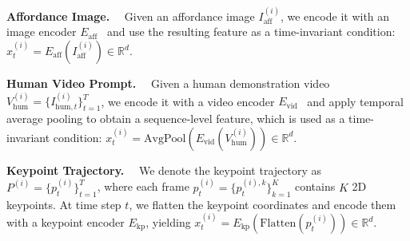 


\textbf{Affordance Image.}~~
Given an affordance image $I_{\mathrm{aff}}^{(i)}$, we encode it with an image encoder $E_{\mathrm{aff}}$~\cite{he2016deep} and use the resulting feature as a time-invariant condition: $x_t^{(i)}=E_{\mathrm{aff}}(I_{\mathrm{aff}}^{(i)})\in\mathbb{R}^{d}$.

\textbf{Human Video Prompt.}~~
Given a human demonstration video $V_{\mathrm{hum}}^{(i)}=\{I_{\mathrm{hum},t}^{(i)}\}_{t=1}^{T}$, we encode it with a video encoder $E_{\mathrm{vid}}$~\cite{bertasius2021space} and apply temporal average pooling to obtain a sequence-level feature, which is used as a time-invariant condition: $x_t^{(i)}=\mathrm{AvgPool}(E_{\mathrm{vid}}(V_{\mathrm{hum}}^{(i)}))\in\mathbb{R}^{d}$.

\textbf{Keypoint Trajectory.}~~
We denote the keypoint trajectory as $P^{(i)}=\{p_t^{(i)}\}_{t=1}^{T}$, where each frame $p_t^{(i)}=\{p_t^{(i),k}\}_{k=1}^{K}$ contains $K$ 2D keypoints.
At time step $t$, we flatten the keypoint coordinates and encode them with a keypoint encoder $E_{\mathrm{kp}}$, yielding $x_t^{(i)}=E_{\mathrm{kp}}(\mathrm{Flatten}(p_t^{(i)}))\in\mathbb{R}^{d}$.

